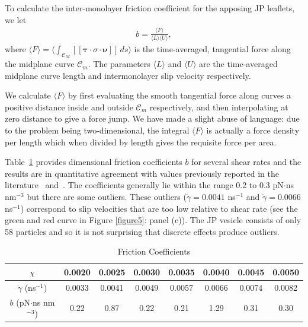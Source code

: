 \documentclass[lineno]{jfm}
\newcommand{\nnu}{\boldsymbol{\nu}}
\newcommand{\ttau}{\boldsymbol{\tau}}
\newcommand{\jump}[1]{[\![ #1 ]\!]}
\begin{document}
To calculate the inter-monolayer friction coefficient for the apposing
JP leaflets, we let
\begin{align}
  b = \frac{\langle F\rangle}{\langle L \rangle \langle U\rangle},
\end{align}
%
where $\langle F\rangle = \langle \int_{\mathcal{C}_M} \jump{\ttau \cdot
\sigma \cdot \nnu} \,ds\rangle$ is the time-averaged, tangential force
along the midplane curve $\mathcal{C}_m$. The parameters $\langle
L\rangle$ and $\langle U\rangle$ are the time-averaged midplane curve
length and intermonolayer slip velocity respectively.

We calculate $\langle F\rangle$ by first evaluating the smooth
tangential force along curves a positive distance inside and outside
$\mathcal{C}_m$ respectively, and then interpolating at zero distance to
give a force jump. We have made a slight abuse of language: due to the
problem being two-dimensional, the integral $\langle F\rangle$ is
actually a force density per length which when divided by length gives
the requisite force per area. 

Table~\ref{table1} provides dimensional friction coefficients $b$ for
several shear rates and the results are in quantitative agreement with
values previously reported in the literature~\cite{sch-vla-mik2010}
and~\cite{denOtter2007}. The coefficients generally lie within the
range 0.2 to 0.3 pN$\cdot$ns nm$^{-3}$ but there are some outliers.
These outliers ($\dot\gamma = 0.0041$ ns$^{-1}$ and $\dot\gamma =
0.0066$ ns$^{-1}$) correspond to slip velocities that are too low
relative to shear rate (see the green and red curve in Figure
\ref{figure5}: panel (c)). The JP vesicle consists of only 58
particles and so it is not surprising that discrete effects produce
outliers. 


\begin{table}
\caption{Friction Coefficients}
\centering
\begin{tabular}{c c c c c c c c }
 $\chi$ & 0.0020   &  0.0025 &  0.0030 &  0.0035 &  0.0040 & 0.0045 & 0.0050  \\
\hline                    
$\dot\gamma$ (ns$^{-1}$)        & 0.0033 & 0.0041 & 0.0049 & 0.0057 & 0.0066 & 0.0074 & 0.0082\\
$b$ (pN$\cdot$ns nm$^{-3}$)    & 0.22 & 0.87  & 0.22 &0.21 & 1.29 & 0.31 & 0.30\\ 
\hline    
\end{tabular} 
\label{table1}
\end{table}
\end{document}
